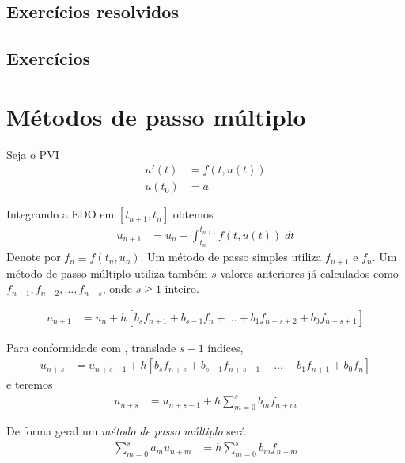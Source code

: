 \subsection*{Exercícios resolvidos}

\emconstrucao

\subsection*{Exercícios}

\emconstrucao

\section{Métodos de passo múltiplo}
Seja o PVI
\begin{eqnarray}
  u'(t) &= f(t,u(t)) \\
  u(t_0) &= a
\end{eqnarray}


Integrando a EDO em $[t_{n+1},t_{n}]$ obtemos
\begin{eqnarray}
  u_{n+1}  &= u_n  + \int _{t_n}^{t_{n+1}} f(t,u(t)) \; dt
\end{eqnarray}
Denote por $f_n\equiv f(t_n,u_n)$. Um método de passo simples utiliza $f_{n+1}$ e $f_{n}$. Um método de passo múltiplo utiliza também $s$ valores anteriores já calculados como $f_{n-1},f_{n-2},\ldots ,f_{n-s}$, onde $s\geq 1$ inteiro.

\begin{eqnarray}
  u_{n+1}  &= u_{n}  + h[b_s f_{n+1}+b_{s-1}f_{n}+\ldots +b_1f_{n-s+2}+b_0f_{n-s+1}]
\end{eqnarray}

Para conformidade com \cite{iserles2009first}, translade $s-1$ índices,
\begin{eqnarray}
  u_{n+s}  &= u_{n+s-1}  + h[b_s f_{n+s}+b_{s-1}f_{n+s-1}+\ldots +b_1f_{n+1}+b_0f_n] \label{multiad}
\end{eqnarray}
e teremos
\begin{eqnarray}
  u_{n+s}  &= u_{n+s-1}  + h \sum_{m=0}^s b_m f_{n+m}
\end{eqnarray}

De forma geral um \emph{método de passo múltiplo} será
\begin{eqnarray}
  \sum_{m=0}^s a_m u_{n+m}  &=  h \sum_{m=0}^s b_m f_{n+m}
\end{eqnarray}

